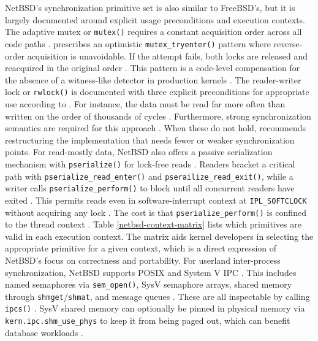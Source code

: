 NetBSD's synchronization primitive set is also similar to FreeBSD's, but it is largely documented around explicit
usage preconditions and execution contexts. The adaptive mutex or \texttt{mutex()} requires a constant acquisition
order across all code paths \parencite{netbsd_mutex}. \textcite{netbsd_mutex} prescribes an optimistic \texttt{mutex\_tryenter()}
pattern where reverse-order acquisition is unavoidable. If the attempt fails, both locks are released and reacquired in
the original order \parencite{netbsd_mutex}. This pattern is a code-level compensation for the absence of a witness-like
detector in production kernels \parencite{netbsd_mutex}. The reader-writer lock or \texttt{rwlock()} is documented with
three explicit preconditions for appropriate use according to \textcite{netbsd_rwlock}. For instance, the data must be read
far more often than written on the order of thousands of cycles \parencite{netbsd_rwlock}. Furthermore, strong synchronization
semantics are required for this approach \parencite{netbsd_rwlock}. When these do not hold, \textcite{netbsd_rwlock}
recommends restructuring the implementation that needs fewer or weaker synchronization points. For read-mostly data, NetBSD
also offers a passive serialization mechanism with \texttt{pserialize()} for lock-free reads \parencite{netbsd_pserialize}.
Readers bracket a critical path with \texttt{pserialize\_read\_enter()} and \texttt{pserailize\_read\_exit()}, while
a writer calls \texttt{pserialize\_perform()} to block until all concurrent readers have exited \parencite{netbsd_pserialize}.
This permits reads even in software-interrupt context at \texttt{IPL\_SOFTCLOCK} without acquiring any lock
\parencite{netbsd_pserialize}. The cost is that \texttt{pserialize\_perform()} is confined to the thread context
\parencite{netbsd_pserialize}. Table \ref{netbsd-context-matrix} lists which primitives are valid in each execution
context. The matrix aids kernel developers in selecting the appropriate primitive for a given context, which is a direct
expression of NetBSD's focus on correctness and portability. For userland inter-process synchronization, NetBSD supports
POSIX and System V IPC \parencite{netbsd_tuning}. This includes named semaphores via \texttt{sem\_open()}, SysV semaphore
arrays, shared memory through \texttt{shmget}/\texttt{shmat}, and message queues \parencite{netbsd_tuning}. These are all
inspectable by calling \texttt{ipcs()} \parencite{netbsd_tuning}. SysV shared memory can optionally be pinned in physical
memory via \texttt{kern.ipc.shm\_use\_phys} to keep it from being paged out, which can benefit database workloads
\parencite{netbsd_tuning}.

